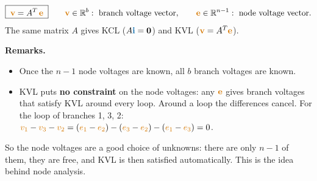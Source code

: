 \documentclass[11pt,a4paper]{article}
\newcommand{\Icol}[1]{\textcolor{ccur}{#1}}
\newcommand{\Vcol}[1]{\textcolor{cvolt}{#1}}
\begin{document}
\begin{ideabox}
\[
  \boxed{\;\Vcol{\mathbf{v}} = A^T\,\Vcol{\mathbf{e}}\;}
  \qquad
  \Vcol{\mathbf{v}} \in \mathbb{R}^{b}:\ \text{branch voltage vector},
  \qquad
  \Vcol{\mathbf{e}} \in \mathbb{R}^{n-1}:\ \text{node voltage vector}.
\]
The same matrix $A$ gives KCL ($A\Icol{\mathbf{i}} = \mathbf{0}$) and KVL
($\Vcol{\mathbf{v}} = A^T\Vcol{\mathbf{e}}$).
\end{ideabox}

\textbf{Remarks.}
\begin{itemize}
  \item Once the $n-1$ node voltages are known, all $b$ branch voltages are known.
  \item KVL puts \textbf{no constraint} on the node voltages: any $\Vcol{\mathbf{e}}$ gives
        branch voltages that satisfy KVL around every loop. Around a loop the differences
        cancel. For the loop of branches 1, 3, 2:
        $\Vcol{v_1} - \Vcol{v_3} - \Vcol{v_2}
          = (\Vcol{e_1} - \Vcol{e_2}) - (\Vcol{e_3} - \Vcol{e_2}) - (\Vcol{e_1} - \Vcol{e_3}) = 0$.
\end{itemize}
So the node voltages are a good choice of unknowns: there are only $n-1$ of them, they are
free, and KVL is then satisfied automatically. This is the idea behind node analysis.
\end{document}
